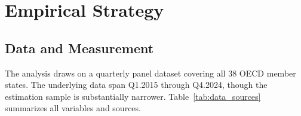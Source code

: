 \documentclass[12pt, a4paper]{article}
\begin{document}

\section{Empirical Strategy}
\label{sec:estimation}


\subsection{Data and Measurement}
\label{subsec:data}

The analysis draws on a quarterly panel dataset covering all 38 OECD member states.
The underlying data span Q1.2015 through Q4.2024, though the estimation sample is
substantially narrower. Table~\ref{tab:data_sources} summarizes all variables and sources.
\end{document}
